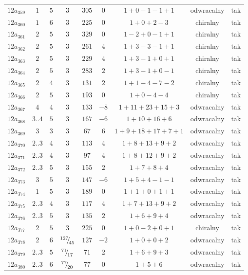 \begin{longtable}{ccccccccc}
$12a_{359}$ & $1$ & $5$ & $3$ & $305$ & $0$ & $1+0-1-1+1$ & odwracalny & tak \\
$12a_{360}$ & $1$ & $6$ & $3$ & $225$ & $0$ & $1+0+2-3$ & chiralny & tak \\
$12a_{361}$ & $2$ & $5$ & $3$ & $329$ & $0$ & $1-2+0-1+1$ & chiralny & tak \\
$12a_{362}$ & $2$ & $5$ & $3$ & $261$ & $4$ & $1+3-3-1+1$ & chiralny & tak \\
$12a_{363}$ & $2$ & $5$ & $3$ & $229$ & $4$ & $1+3-1+0+1$ & chiralny & tak \\
$12a_{364}$ & $2$ & $5$ & $3$ & $283$ & $2$ & $1+3-1+0-1$ & chiralny & tak \\
$12a_{365}$ & $2$ & $4$ & $3$ & $131$ & $2$ & $1+1-4-7-2$ & chiralny & tak \\
$12a_{366}$ & $2$ & $5$ & $3$ & $193$ & $0$ & $1+0-4-4$ & chiralny & tak \\
$12a_{367}$ & $4$ & $4$ & $3$ & $133$ & $-8$ & $1+11+23+15+3$ & odwracalny & tak \\
$12a_{368}$ & $3..4$ & $5$ & $3$ & $167$ & $-6$ & $1+10+16+6$ & odwracalny & tak \\
$12a_{369}$ & $3$ & $3$ & $3$ & $67$ & $6$ & $1+9+18+17+7+1$ & odwracalny & tak \\
$12a_{370}$ & $2..3$ & $4$ & $3$ & $113$ & $4$ & $1+8+13+9+2$ & odwracalny & tak \\
$12a_{371}$ & $2..3$ & $4$ & $3$ & $97$ & $4$ & $1+8+12+9+2$ & odwracalny & tak \\
$12a_{372}$ & $2..3$ & $5$ & $3$ & $155$ & $2$ & $1+7+8+4$ & odwracalny & tak \\
$12a_{373}$ & $3$ & $5$ & $3$ & $147$ & $-6$ & $1+5+4-1-1$ & odwracalny & tak \\
$12a_{374}$ & $1$ & $5$ & $3$ & $189$ & $0$ & $1+1+0+1+1$ & odwracalny & tak \\
$12a_{375}$ & $2..3$ & $4$ & $3$ & $117$ & $4$ & $1+7+13+9+2$ & odwracalny & tak \\
$12a_{376}$ & $2..3$ & $5$ & $3$ & $135$ & $2$ & $1+6+9+4$ & odwracalny & tak \\
$12a_{377}$ & $2$ & $5$ & $3$ & $225$ & $0$ & $1+0-2+0+1$ & chiralny & tak \\
$12a_{378}$ & $2$ & $6$ & ${}^{127}{\mskip -5mu/\mskip -3mu}_{45}$ & $127$ & $-2$ & $1+0+0+2$ & odwracalny & tak \\
$12a_{379}$ & $2..3$ & $5$ & ${}^{71}{\mskip -5mu/\mskip -3mu}_{17}$ & $71$ & $2$ & $1+6+9+3$ & odwracalny & tak \\
$12a_{380}$ & $2..3$ & $6$ & ${}^{77}{\mskip -5mu/\mskip -3mu}_{20}$ & $77$ & $0$ & $1+5+6$ & odwracalny & tak \\

\end{longtable}

